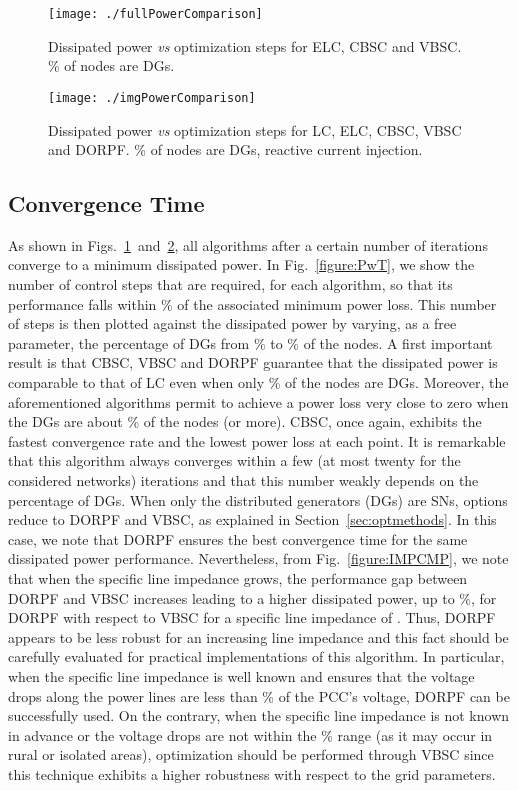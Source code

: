 \documentclass[journal]{IEEEtran}
\newcommand{\fig}[1]{Fig.~\ref{#1}}
\newcommand{\figs}[2]{Figs.~\ref{#1}~and~\ref{#2}}
\newcommand{\secref}[1]{Section~\ref{#1}}
\begin{document}
\begin{figure}
\centering
\texttt{[image: ./fullPowerComparison]}
\caption{Dissipated power {\it vs} optimization steps for ELC, CBSC and VBSC. \% of nodes are DGs.\label{figure:fullPowerComp}}
\end{figure}

\begin{figure}
\centering
\texttt{[image: ./imgPowerComparison]}
\caption{Dissipated power {\it vs} optimization steps for LC, ELC, CBSC, VBSC and DORPF. \% of nodes are DGs, reactive current injection.\label{figure:imgPowerComp}}
\end{figure}


\subsection{Convergence Time}
\label{ssec:algoConvergence}

As shown in \figs{figure:fullPowerComp}{figure:imgPowerComp}, all algorithms after a certain number of iterations converge to a minimum dissipated power. In \fig{figure:PwT}, we show the number of control steps that are required, for each algorithm, so that its performance 
falls within \% of the associated minimum power loss. This number of steps is then plotted against the dissipated power by varying, as a free parameter, the percentage of DGs from \% to \% of the nodes. A first important result is that CBSC, VBSC and DORPF guarantee that the dissipated power is comparable to that of LC even when only \% of the nodes are DGs. Moreover, the aforementioned algorithms permit to achieve a  power loss very close to zero when the DGs are about \% of the nodes (or more). CBSC, once again, exhibits the fastest convergence rate and the lowest power loss at each point. It is remarkable that this algorithm always converges within a few (at most twenty for the considered networks) iterations and that this number weakly depends on the percentage of DGs. When only the distributed generators (DGs) are SNs, options reduce to DORPF and VBSC, as explained in \secref{sec:optmethods}. In this case, we note that DORPF ensures the best convergence time for the same dissipated power performance. Nevertheless, from \fig{figure:IMPCMP}, we note that when the specific line impedance grows, the  performance gap between DORPF and VBSC increases leading to a higher dissipated power, up to \%, for DORPF with respect to VBSC for a specific line impedance of . Thus, DORPF appears to be less robust for an increasing line impedance and this fact should be carefully evaluated for practical implementations of this algorithm. In particular, when the specific line impedance is well known and ensures that the voltage drops along the power lines are less than \% of the PCC's voltage, DORPF can be successfully used. On the contrary, when the specific line impedance is not known in advance or the voltage drops are not within the \% range (as it may occur in rural or isolated areas), optimization should be performed through VBSC since this technique exhibits a higher robustness with respect to the grid parameters.
\end{document}
